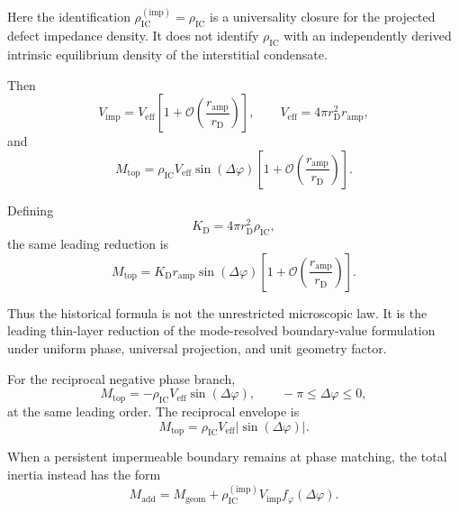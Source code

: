 Here the identification $\rho_{\mathrm{IC}}^{(\mathrm{imp})} = \rho_{\mathrm{IC}}$ is a universality closure for the projected defect impedance density. It does not identify $\rho_{\mathrm{IC}}$ with an independently derived intrinsic equilibrium density of the interstitial condensate.

Then
\begin{equation}
    V_{\mathrm{imp}} = V_{\mathrm{eff}}\left[1+\mathcal{O}\left(\frac{r_{\mathrm{amp}}}{r_{\mathrm{D}}}\right)\right], \qquad V_{\mathrm{eff}} = 4\pi r_{\mathrm{D}}^2 r_{\mathrm{amp}},
\end{equation}
and
\begin{equation}
    M_{\mathrm{top}} = \rho_{\mathrm{IC}}V_{\mathrm{eff}}\sin(\Delta\varphi)\left[1+\mathcal{O}\left(\frac{r_{\mathrm{amp}}}{r_{\mathrm{D}}}\right)\right].
\end{equation}

Defining
\begin{equation}
    K_{\mathrm{D}} = 4\pi r_{\mathrm{D}}^2\rho_{\mathrm{IC}},
\end{equation}
the same leading reduction is
\begin{equation}
    M_{\mathrm{top}} = K_{\mathrm{D}}r_{\mathrm{amp}}\sin(\Delta\varphi)\left[1+\mathcal{O}\left(\frac{r_{\mathrm{amp}}}{r_{\mathrm{D}}}\right)\right].
\end{equation}

Thus the historical formula is not the unrestricted microscopic law. It is the leading thin-layer reduction of the mode-resolved boundary-value formulation under uniform phase, universal projection, and unit geometry factor.

For the reciprocal negative phase branch,
\begin{equation}
    M_{\mathrm{top}} = -\rho_{\mathrm{IC}}V_{\mathrm{eff}}\sin(\Delta\varphi), \qquad -\pi \leq \Delta\varphi \leq 0,
\end{equation}
at the same leading order. The reciprocal envelope is
\begin{equation}
    M_{\mathrm{top}} = \rho_{\mathrm{IC}}V_{\mathrm{eff}}|\sin(\Delta\varphi)|.
\end{equation}

When a persistent impermeable boundary remains at phase matching, the total inertia instead has the form
\begin{equation}
    M_{\mathrm{add}} = M_{\mathrm{geom}} + \rho_{\mathrm{IC}}^{(\mathrm{imp})}V_{\mathrm{imp}}f_{\varphi}(\Delta\varphi).
\end{equation}

